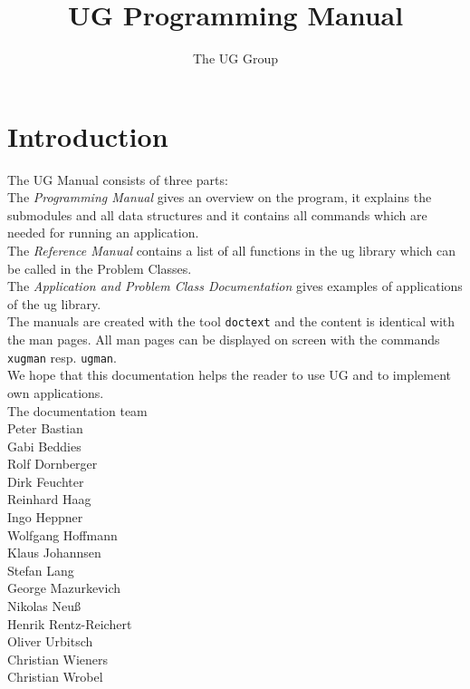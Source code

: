 



\pagestyle{myheadings}
\sloppy
\makeindex


\newcommand{\sectitle}{\mbox{}}
\setcounter{page}{0}

\title{UG Programming Manual}
\author{The UG Group}

\maketitle


\section*{Introduction}

The UG Manual consists of three parts:
\\[5mm]  
The {\em Programming Manual} gives an overview on the program, it
explains the submodules and all data structures and it contains
all commands which are needed for running an application.
\\[5mm]  
The {\em Reference Manual} contains a list of all 
functions in the ug library which can be called in the Problem Classes.
\\[5mm]
The {\em Application and Problem Class Documentation} gives examples
of applications of the ug library.
\\[5mm]
The manuals are created with the tool {\tt doctext} and the content is 
identical with the man pages. All man pages can be displayed on screen 
with the commands {\tt xugman} resp. {\tt ugman}.
\\[5mm]
We hope that this documentation helps the reader to use UG 
and to implement own applications.
\\[1cm]
The documentation team
\\[1cm]
Peter Bastian\\
Gabi Beddies\\
Rolf Dornberger\\
Dirk Feuchter\\
Reinhard Haag\\
Ingo Heppner\\
Wolfgang Hoffmann\\
Klaus Johannsen\\
Stefan Lang\\
George Mazurkevich\\
Nikolas Neu\ss\\
Henrik Rentz-Reichert\\
Oliver Urbitsch\\
Christian Wieners\\
Christian Wrobel


